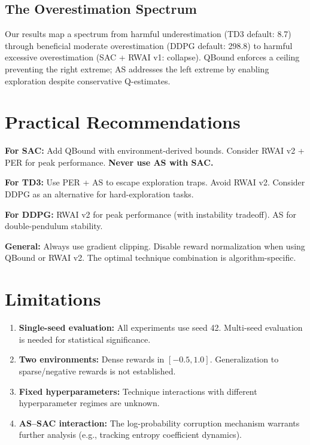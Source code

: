 \documentclass[11pt,a4paper]{article}
\begin{document}
\subsection{The Overestimation Spectrum}

Our results map a spectrum from harmful underestimation (TD3 default: 8.7) through beneficial moderate overestimation (DDPG default: 298.8) to harmful excessive overestimation (SAC + RWAI v1: collapse). QBound enforces a ceiling preventing the right extreme; AS addresses the left extreme by enabling exploration despite conservative Q-estimates.

\section{Practical Recommendations}

\textbf{For SAC:} Add QBound with environment-derived bounds. Consider RWAI v2 + PER for peak performance. \textbf{Never use AS with SAC.}

\textbf{For TD3:} Use PER + AS to escape exploration traps. Avoid RWAI v2. Consider DDPG as an alternative for hard-exploration tasks.

\textbf{For DDPG:} RWAI v2 for peak performance (with instability tradeoff). AS for double-pendulum stability.

\textbf{General:} Always use gradient clipping. Disable reward normalization when using QBound or RWAI v2. The optimal technique combination is algorithm-specific.

\section{Limitations}

\begin{enumerate}
\item \textbf{Single-seed evaluation:} All experiments use seed 42. Multi-seed evaluation is needed for statistical significance.
\item \textbf{Two environments:} Dense rewards in $[-0.5, 1.0]$. Generalization to sparse/negative rewards is not established.
\item \textbf{Fixed hyperparameters:} Technique interactions with different hyperparameter regimes are unknown.
\item \textbf{AS--SAC interaction:} The log-probability corruption mechanism warrants further analysis (e.g., tracking entropy coefficient dynamics).
\end{enumerate}
\end{document}

